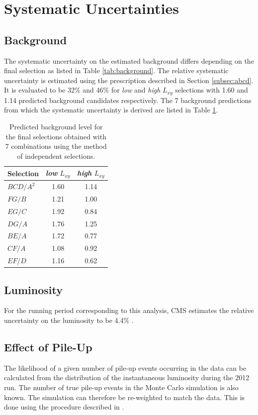 \section{Systematic Uncertainties}
\label{sec:systematics}

\subsection{Background}
The systematic uncertainty on the estimated background differs depending on the final selection
 as listed in Table \ref{tab:background}. The relative systematic uncertainty is estimated using the prescription
described in Section \ref{subsec:abcd}. It is evaluated to be 32\% and 46\%
for {\it low} and {\it high} $L_{xy}$ selections with 1.60 and 1.14 predicted background candidates respectively. 
The 7 background predictions from which the systematic uncertainty is derived are listed in Table \ref{tab:sigbkg}.

\begin{table}[htbp]
\centering
\caption{Predicted background level for the final selections obtained with 7 combinations using the
method of independent selections. \label{tab:sigbkg}}

\begin{tabular}{lcc}

\hline
Selection & {\it low} $L_{xy} $& {\it high} $L_{xy}$ \\
\hline
$BCD/A^2$ & 1.60 & 1.14 \\
$FG/B$ & 1.21 & 1.00 \\
$EG/C$ & 1.92 & 0.84 \\
$DG/A$ & 1.76 & 1.25 \\
$BE/A$ & 1.72 & 0.77 \\
$CF/A$ & 1.08 & 0.92 \\
$EF/D$ & 1.16 & 0.62 \\
\hline

\end{tabular}
\end{table} 


\subsection{Luminosity}
For the running period corresponding to this analysis, CMS estimates the relative uncertainty on the luminosity to be 4.4\% \cite{cms:lumi12}.

\subsection{Effect of Pile-Up}
The likelihood of a given number of pile-up events occurring in the data can be calculated from the distribution
 of the instantaneous luminosity during the 2012 run. The number of true pile-up events in the Monte Carlo
 simulation is also known. The simulation can therefore be re-weighted to match the data. This is done using 
the procedure described in \cite{PileUp}.

